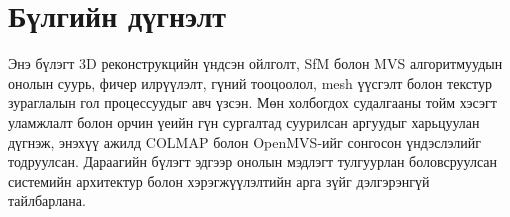 \section{Бүлгийн дүгнэлт}

Энэ бүлэгт 3D реконструкцийн үндсэн ойлголт, SfM болон MVS алгоритмуудын онолын
суурь, фичер илрүүлэлт, гүний тооцоолол, mesh үүсгэлт болон текстур зураглалын гол
процессуудыг авч үзсэн. Мөн холбогдох судалгааны тойм хэсэгт уламжлалт болон орчин
үеийн гүн сургалтад суурилсан аргуудыг харьцуулан дүгнэж, энэхүү ажилд COLMAP болон
OpenMVS-ийг сонгосон үндэслэлийг тодруулсан. Дараагийн бүлэгт эдгээр онолын мэдлэгт
тулгуурлан боловсруулсан системийн архитектур болон хэрэгжүүлэлтийн арга зүйг
дэлгэрэнгүй тайлбарлана.